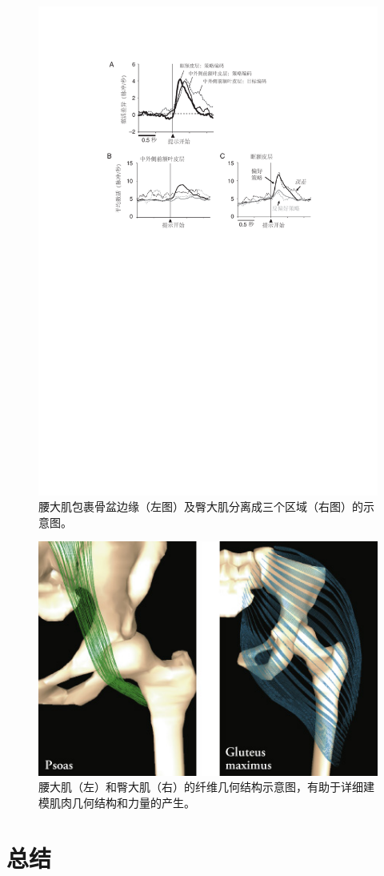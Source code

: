 \begin{figure}[!htb]
	\centering
	\includegraphics[width=0.7\linewidth]{chap6/6_15}
	\caption{腰大肌包裹骨盆边缘（左图）及臀大肌分离成三个区域（右图）的示意图\cite{blemker2005three}。 \label{fig:6_15}}
\end{figure}


\begin{figure}[!htb]
	\centering
	\includegraphics[width=0.7\linewidth]{chap6/6_16}
	\caption{腰大肌（左）和臀大肌（右）的纤维几何结构示意图，有助于详细建模肌肉几何结构和力量的产生\cite{blemker2005three}。 \label{fig:6_16}}
\end{figure}


\section{总结}

